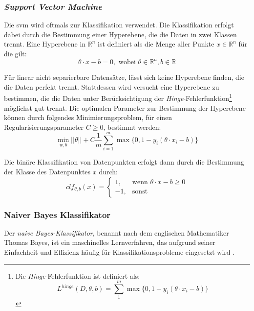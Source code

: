 \documentclass[researchlab,group,]{AIGpaper}
\begin{document}
\subsubsection{\textit{Support Vector Machine}}

Die \gls{svm} wird oftmals zur Klassifikation verwendet.
Die Klassifikation erfolgt dabei durch die Bestimmung einer Hyperebene, die die Daten in zwei Klassen trennt.
Eine Hyperebene in $\mathbb{R}^{n}$ ist definiert als die Menge aller Punkte $x\in\mathbb{R}^n$ für die gilt:
\begin{equation*}
    \theta \cdot x - b = 0, \text{ wobei } \theta \in \mathbb{R}^{n}, b\in\mathbb{R}
\end{equation*}

Für linear nicht separierbare Datensätze, lässt sich keine Hyperebene finden, die die Daten perfekt trennt.
Stattdessen wird versucht eine Hyperebene zu bestimmen, die die Daten unter Berücksichtigung der \textit{Hinge}-Fehlerfunktion\footnote{
Die \textit{Hinge}-Fehlerfunktion ist definiert als:
\begin{equation*}
    L^{hinge}(D, \theta, b) = \sum_{1}^{m}\max\lbrace0, 1 - y_i(\theta \cdot x_i - b)\rbrace
\end{equation*}
} möglichst gut trennt.
Die optimalen Parameter zur Bestimmung der Hyperebene können durch folgendes Minimierungsproblem, für einen Regularisierungsparameter $C\geq0$, bestimmt werden:
\begin{equation*}
    \min_{w, b} \lvert\lvert \theta \rvert\rvert + C \frac{1}{m}\sum_{i=1}^{m} \max\lbrace0, 1 - y_i(\theta \cdot x_i - b)\rbrace
\end{equation*}

Die binäre Klassifikation von Datenpunkten erfolgt dann durch die Bestimmung der Klasse des Datenpunktes $x$ durch:
\begin{equation*}
        clf_{\theta, b}(x) =
        \begin{cases}
        1, & \text{wenn } \theta \cdot x - b \geq 0 \\
        -1, & \text{sonst}
    \end{cases}
\end{equation*}


\subsubsection{Naiver Bayes Klassifikator}
Der \textit{naive Bayes-Klassifikator}, benannt nach dem englischen Mathematiker Thomas Bayes, ist ein maschinelles Lernverfahren, das aufgrund seiner Einfachheit und Effizienz häufig für Klassifikationsprobleme eingesetzt wird \cite{wankhade2022survey, medhat2014sentiment, zimbra2018state}.
\end{document}
